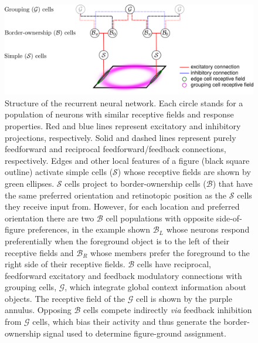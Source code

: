 \documentclass[12pt]{article}
\begin{document}
\begin{figure}[t]
\hfill
\begin{center}
\includegraphics[width=\textwidth]{figs/model_circuit.png}
\end{center}
\caption{Structure of the recurrent neural network. Each circle stands for a
  population of neurons with similar receptive fields and response
  properties.  Red and blue lines represent excitatory and inhibitory projections,
  respectively. Solid and dashed lines represent purely feedforward and reciprocal feedforward/feedback connections, respectively. Edges and other local features of a figure (black square outline) activate simple cells ($\mathcal{S}$) whose receptive
  fields are shown by green ellipses. $\mathcal{S}$ cells project to border-ownership cells ($\mathcal{B}$) that have the same preferred orientation and
  retinotopic position as the $\mathcal{S}$ cells they receive input
  from. However, for each location and preferred orientation there are
  two $\mathcal{B}$ cell populations with opposite side-of-figure preferences, in
  the example shown $\mathcal{B}_{L}$ whose neurons respond preferentially when
  the foreground object is to the left of their receptive fields and
  $\mathcal{B}_{R}$ whose members prefer the foreground to the right side of
  their receptive fields. $\mathcal{B}$ cells have reciprocal, feedforward
  excitatory and feedback modulatory connections with grouping cells, $\mathcal{G}$, which integrate global context information about objects. The receptive field of the $\mathcal{G}$ cell is shown by the purple annulus. Opposing $\mathcal{B}$ cells compete indirectly {\em via}
  feedback inhibition
  from $\mathcal{G}$ cells, which bias their activity and thus generate the border-ownership signal used to determine figure-ground assignment.}
\label{Fig:model}
\end{figure}
\end{document}
